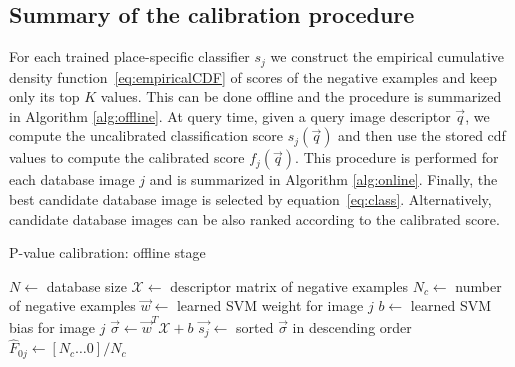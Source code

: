   \subsection{Summary of the calibration procedure}
    For each trained place-specific classifier $s_j$ we construct the empirical cumulative density function~\eqref{eq:empiricalCDF} of scores of the negative examples and keep only its top $K$ values. This can be done offline and the procedure is summarized in Algorithm \ref{alg:offline}. 
    At query time, given a query image descriptor $\vec{q}$, we compute the uncalibrated classification score $s_j(\vec{q})$ and then use the stored cdf values to compute the calibrated score $f_j(\vec{q})$. This procedure is performed for each database image $j$ and is summarized in Algorithm \ref{alg:online}.
    Finally, the best candidate database image is selected by equation~\eqref{eq:class}. Alternatively, candidate database images can be also ranked according to the calibrated score.
%
      \begin{algorithm}
          \caption{P-value calibration: offline stage}
          \label{alg:offline}
          \begin{algorithmic}[1]
              \State $N \gets$ database size
              \State $\mathcal{X} \gets$ descriptor matrix of negative examples %
                \State $N_c \gets$ number of negative examples
                \State $\vec{w} \gets$ learned SVM weight for image $j$
                \State $b \gets$ learned SVM bias for image $j$
                \State $\vec{\sigma} \gets \vec{w}^T \mathcal{X}+b$
                \State $\vec{s_j} \gets$ sorted $\vec{\sigma}$ in descending order
                \State $\hat{F}_{0j} \gets [N_c \dots 0]/N_c$
              \EndFor
              \EndProcedure
         \end{algorithmic}
      \end{algorithm}
